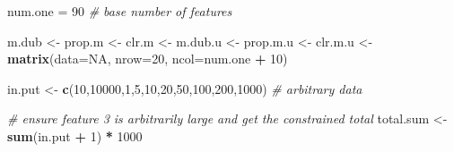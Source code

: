 \documentclass[onecolumn]{article}
\newenvironment{Shaded}{\begin{snugshade}}{\end{snugshade}}
\newcommand{\CommentTok}[1]{\textcolor[rgb]{0.56,0.35,0.01}{\textit{#1}}}
\newcommand{\DataTypeTok}[1]{\textcolor[rgb]{0.13,0.29,0.53}{#1}}
\newcommand{\DecValTok}[1]{\textcolor[rgb]{0.00,0.00,0.81}{#1}}
\newcommand{\KeywordTok}[1]{\textcolor[rgb]{0.13,0.29,0.53}{\textbf{#1}}}
\newcommand{\NormalTok}[1]{#1}
\newcommand{\OperatorTok}[1]{\textcolor[rgb]{0.81,0.36,0.00}{\textbf{#1}}}
\newcommand{\OtherTok}[1]{\textcolor[rgb]{0.56,0.35,0.01}{#1}}
\newcommand{\StringTok}[1]{\textcolor[rgb]{0.31,0.60,0.02}{#1}}
\begin{document}
\begin{Shaded}
\begin{Highlighting}[]
\NormalTok{num.one =}\StringTok{ }\DecValTok{90} \CommentTok{# base number of features}

\NormalTok{m.dub <-}\StringTok{ }\NormalTok{prop.m <-}\StringTok{ }\NormalTok{clr.m <-}\StringTok{ }\NormalTok{m.dub.u <-}\StringTok{ }\NormalTok{prop.m.u <-}\StringTok{ }\NormalTok{clr.m.u <-}
\StringTok{    }\KeywordTok{matrix}\NormalTok{(}\DataTypeTok{data=}\OtherTok{NA}\NormalTok{, }\DataTypeTok{nrow=}\DecValTok{20}\NormalTok{, }\DataTypeTok{ncol=}\NormalTok{num.one }\OperatorTok{+}\StringTok{ }\DecValTok{10}\NormalTok{)}

\NormalTok{in.put <-}\StringTok{ }\KeywordTok{c}\NormalTok{(}\DecValTok{10}\NormalTok{,}\DecValTok{10000}\NormalTok{,}\DecValTok{1}\NormalTok{,}\DecValTok{5}\NormalTok{,}\DecValTok{10}\NormalTok{,}\DecValTok{20}\NormalTok{,}\DecValTok{50}\NormalTok{,}\DecValTok{100}\NormalTok{,}\DecValTok{200}\NormalTok{,}\DecValTok{1000}\NormalTok{) }\CommentTok{# arbitrary data}

\CommentTok{# ensure feature 3 is arbitrarily large and get the constrained total}
\NormalTok{total.sum <-}\StringTok{ }\KeywordTok{sum}\NormalTok{(in.put }\OperatorTok{+}\StringTok{ }\DecValTok{1}\NormalTok{) }\OperatorTok{*}\StringTok{ }\DecValTok{1000}


\end{Highlighting}
\end{Shaded}
\end{document}
